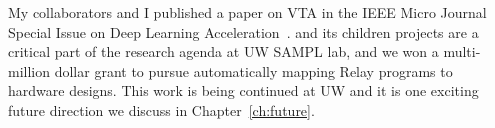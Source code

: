My collaborators and I published a paper on VTA in
  the IEEE Micro Journal Special Issue on Deep Learning Acceleration~\citep{moreau2018vta}.
\vta and its children projects are a critical part of the research
  agenda at UW SAMPL lab, and we won a multi-million dollar grant to
  pursue automatically mapping Relay programs to hardware designs.
This work is being continued at UW and it is one exciting future
  direction we discuss in Chapter~\ref{ch:future}.
